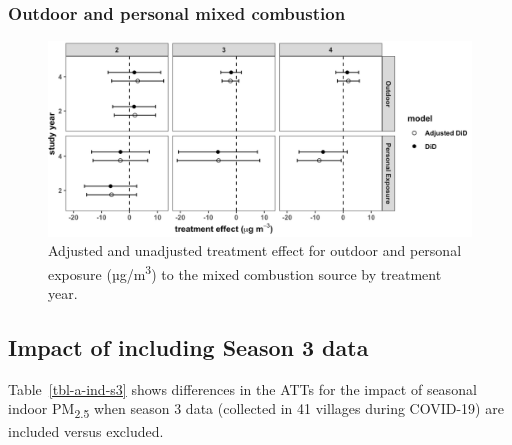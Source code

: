 \documentclass[
  letterpaper,
  DIV=11,
  numbers=noendperiod]{scrartcl}
\begin{document}
\hypertarget{outdoor-and-personal-mixed-combustion}{%
\subsubsection{Outdoor and personal mixed
combustion}\label{outdoor-and-personal-mixed-combustion}}

\begin{figure}[H]

{\centering \includegraphics[width=1\textwidth,height=\textheight]{images/did-mixed-ct.png}

}

\caption{\label{fig-afig-mixed-ct}Adjusted and unadjusted treatment
effect for outdoor and personal exposure (µg/m\textsuperscript{3}) to
the mixed combustion source by treatment year.}

\end{figure}

\hypertarget{impact-of-including-season-3-data}{%
\subsection{Impact of including Season 3
data}\label{impact-of-including-season-3-data}}

Table~\ref{tbl-a-ind-s3} shows differences in the ATTs for the impact of
seasonal indoor PM\textsubscript{2.5} when season 3 data (collected in
41 villages during COVID-19) are included versus excluded.
\end{document}
